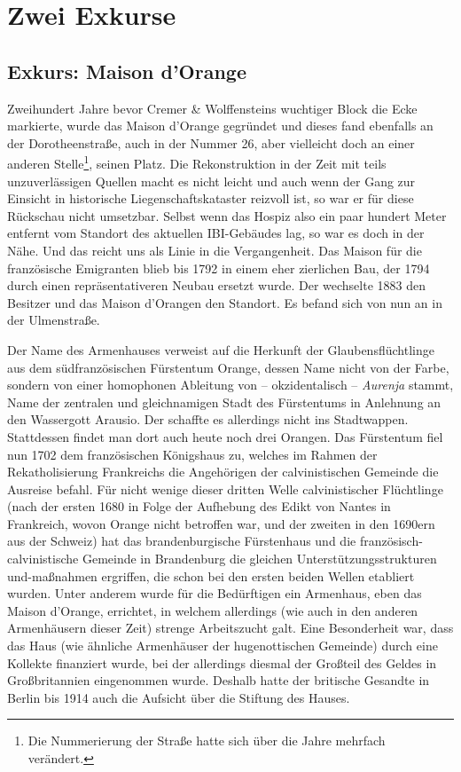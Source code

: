 \documentclass[a4paper,
fontsize=11pt,
oneside,
numbers=noperiodatend,
parskip=half-,
bibliography=totoc,
final
]{scrartcl}
\begin{document}
\hypertarget{zwei-exkurse}{%
\section{Zwei Exkurse}\label{zwei-exkurse}}

\hypertarget{exkurs-maison-dorange}{%
\subsection{Exkurs: Maison d'Orange}\label{exkurs-maison-dorange}}

Zweihundert Jahre bevor Cremer \& Wolffensteins wuchtiger Block die Ecke
markierte, wurde das Maison d'Orange gegründet und dieses fand ebenfalls
an der Dorotheenstraße, auch in der Nummer 26, aber vielleicht doch an
einer anderen Stelle\footnote{Die Nummerierung der Straße hatte sich
  über die Jahre mehrfach verändert.}, seinen Platz. Die Rekonstruktion
in der Zeit mit teils unzuverlässigen Quellen macht es nicht leicht und
auch wenn der Gang zur Einsicht in historische Liegenschaftskataster
reizvoll ist, so war er für diese Rückschau nicht umsetzbar. Selbst wenn
das Hospiz also ein paar hundert Meter entfernt vom Standort des
aktuellen IBI-Gebäudes lag, so war es doch in der Nähe. Und das reicht
uns als Linie in die Vergangenheit. Das Maison für die französische
Emigranten blieb bis 1792 in einem eher zierlichen Bau, der 1794 durch
einen repräsentativeren Neubau ersetzt wurde. Der wechselte 1883 den
Besitzer und das Maison d'Orangen den Standort. Es befand sich von nun
an in der Ulmenstraße.

Der Name des Armenhauses verweist auf die Herkunft der
Glaubensflüchtlinge aus dem südfranzösischen Fürstentum Orange, dessen
Name nicht von der Farbe, sondern von einer homophonen Ableitung von --
okzidentalisch -- \emph{Aurenja} stammt, Name der zentralen und
gleichnamigen Stadt des Fürstentums in Anlehnung an den Wassergott
Arausio. Der schaffte es allerdings nicht ins Stadtwappen. Stattdessen
findet man dort auch heute noch drei Orangen. Das Fürstentum fiel nun
1702 dem französischen Königshaus zu, welches im Rahmen der
Rekatholisierung Frankreichs die Angehörigen der calvinistischen
Gemeinde die Ausreise befahl. Für nicht wenige dieser dritten Welle
calvinistischer Flüchtlinge (nach der ersten 1680 in Folge der Aufhebung
des Edikt von Nantes in Frankreich, wovon Orange nicht betroffen war,
und der zweiten in den 1690ern aus der Schweiz) hat das brandenburgische
Fürstenhaus und die französisch-calvinistische Gemeinde in Brandenburg
die gleichen Unterstützungsstrukturen und-maßnahmen ergriffen, die schon
bei den ersten beiden Wellen etabliert wurden. Unter anderem wurde für
die Bedürftigen ein Armenhaus, eben das Maison d'Orange, errichtet, in
welchem allerdings (wie auch in den anderen Armenhäusern dieser Zeit)
strenge Arbeitszucht galt. Eine Besonderheit war, dass das Haus (wie
ähnliche Armenhäuser der hugenottischen Gemeinde) durch eine Kollekte
finanziert wurde, bei der allerdings diesmal der Großteil des Geldes in
Großbritannien eingenommen wurde. Deshalb hatte der britische Gesandte
in Berlin bis 1914 auch die Aufsicht über die Stiftung des Hauses.
\end{document}
